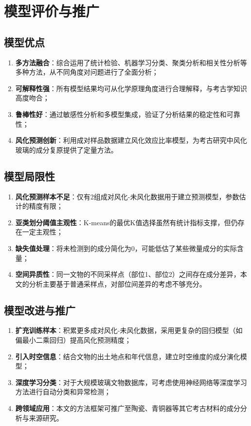 \documentclass[12pt,a4paper]{ctexart}
\begin{document}
\section{模型评价与推广}

\subsection{模型优点}

\begin{enumerate}[label=(\arabic*)]
    \item \textbf{多方法融合}：综合运用了统计检验、机器学习分类、聚类分析和相关性分析等多种方法，从不同角度对问题进行了全面分析；
    \item \textbf{可解释性强}：所有模型结果均可从化学原理角度进行合理解释，与考古学知识高度吻合；
    \item \textbf{鲁棒性好}：通过敏感性分析和多模型集成，验证了分析结果的稳定性和可靠性；
    \item \textbf{风化预测创新}：利用成对样品数据建立风化效应比率模型，为考古研究中风化玻璃的成分复原提供了定量方法。
\end{enumerate}

\subsection{模型局限性}

\begin{enumerate}[label=(\arabic*)]
    \item \textbf{风化预测样本不足}：仅有2组成对风化-未风化数据用于建立预测模型，参数估计的精度有限；
    \item \textbf{亚类划分阈值主观性}：K-means的最优K值选择虽然有统计指标支撑，但仍存在一定主观性；
    \item \textbf{缺失值处理}：将未检测到的成分简化为0，可能低估了某些微量成分的实际含量；
    \item \textbf{空间异质性}：同一文物的不同采样点（部位1、部位2）之间存在成分差异，本文的分析主要基于普通采样点，对部位间差异的考虑不够充分。
\end{enumerate}

\subsection{模型改进与推广}

\begin{enumerate}[label=(\arabic*)]
    \item \textbf{扩充训练样本}：积累更多成对风化-未风化数据，采用更复杂的回归模型（如偏最小二乘回归）提高风化预测精度；
    \item \textbf{引入时空信息}：结合文物的出土地点和年代信息，建立时空维度的成分演化模型；
    \item \textbf{深度学习分类}：对于大规模玻璃文物数据库，可考虑使用神经网络等深度学习方法进行自动分类和异常检测；
    \item \textbf{跨领域应用}：本文的方法框架可推广至陶瓷、青铜器等其它考古材料的成分分析与来源研究。
\end{enumerate}
\end{document}
